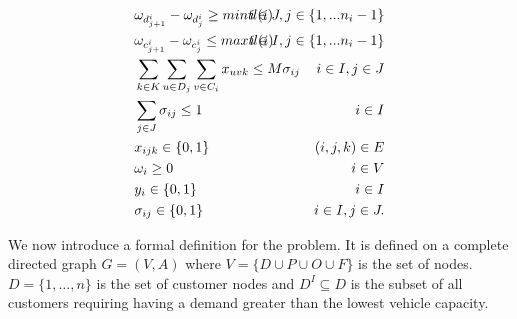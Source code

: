 \documentclass{article}
\begin{document}
{\begin{align}
	\label{sch_14}   &  \omega_{d^{i}_{j+1}} - \omega_{d^{i}_{j}} \geq mintl(i) &   \hspace{-20mm}  i \in J, j \in \{1,...n_i-1\}    \\
	\label{sch_15}   &  \omega_{c^{i}_{j+1}} - \omega_{c^{i}_{j}} \leq maxtl(i) &   \hspace{-20mm}  i \in I, j \in \{1,...n_i-1\}    \\
    \label{sch_16}   & \sum_{k \in K} \sum_{u \in D_j}\sum_{v \in C_i}x_{uvk}  \leq M\sigma_{ij} &   i \in I, j \in J   \\
    \label{sch_17}   &  \sum_{j \in J}\sigma_{ij} \leq 1 &   i \in I   \\
    \label{sch_18}   & x_{ijk} \in \{0,1\} &   (i,j,k) \in E   \\
    \label{sch_19}   &  \omega_i \geq 0 &   i \in V   \\
    \label{sch_20}   & y_{i} \in \{0,1\} &   i \in I   \\
    \label{sch_21}   &  \sigma_{ij} \in \{0,1\} &   i \in I, j \in J.   
\end{align}

\label{sec_formulation}


\fi


\iffalse
We now introduce a formal definition for the problem. It is defined on a complete directed graph $G = (V, A)$ where $V = \{D \cup P \cup O \cup F\}$ is the set of nodes.  $D = \{1,\dots, n\}$ is the set of customer nodes and $D^I \subseteq D$ is the subset of all customers requiring having a demand greater than the lowest vehicle capacity.

}
\end{document}
